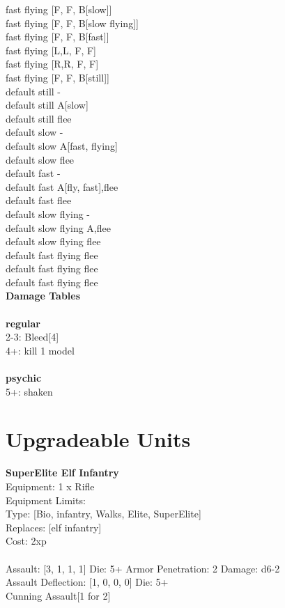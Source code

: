 fast flying [F, F, B[slow]] \\
fast flying [F, F, B[slow flying]] \\
fast flying [F, F, B[fast]] \\
fast flying [L,L, F, F] \\
fast flying [R,R, F, F] \\
fast flying [F, F, B[still]] \\
default still - \\
default still A[slow] \\
default still flee \\
default slow - \\
default slow A[fast, flying] \\
default slow flee \\
default fast - \\
default fast A[fly, fast],flee \\
default fast flee \\
default slow flying - \\
default slow flying A,flee \\
default slow flying flee \\
default fast flying flee \\
default fast flying flee \\
default fast flying flee \\


{\bf Damage Tables} \\
\ \\ {\bf regular } \\
2-3: Bleed[4] \\
4+: kill 1 model \\
\ \\ {\bf psychic } \\
5+: shaken \\










\pagebreak\section{Upgradeable Units}{\bf SuperElite Elf Infantry } \\
Equipment: 1 x Rifle \\
Equipment Limits:  \\
Type: [Bio, infantry, Walks, Elite, SuperElite] \\
Replaces: [elf infantry] \\
Cost: 2xp\\
\ \\
Assault: [3, 1, 1, 1] Die: 5+ Armor Penetration: 2 Damage: d6-2 \\
Assault Deflection: [1, 0, 0, 0] Die: 5+\\
\indent Cunning Assault[1 for 2]\\ 
 
